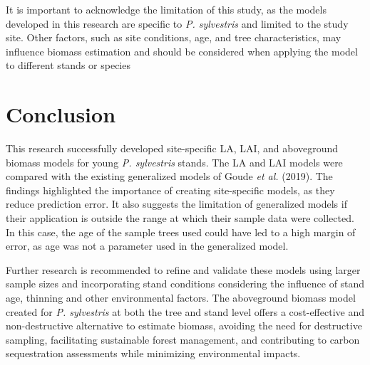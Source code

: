 \documentclass[11pt, a4paper]{report}
\begin{document}
It is important to acknowledge the limitation of this study, as the models developed in this research are specific to \textit{P. sylvestris} and limited to the study site. Other factors, such as site conditions, age, and tree characteristics, may influence biomass estimation and should be considered when applying the model to different stands or species

\chapter{Conclusion}
This research successfully developed site-specific LA, LAI, and aboveground biomass models for young \textit{P. sylvestris} stands. The LA and LAI models were compared with the existing generalized models of Goude \textit{et al.} (2019). The findings highlighted the importance of creating site-specific models, as they reduce prediction error. It also suggests the limitation of generalized models if their application is outside the range at which their sample data were collected. In this case, the age of the sample trees used could have led to a high margin of error, as age was not a parameter used in the generalized model.

Further research is recommended to refine and validate these models using larger sample sizes and incorporating stand conditions considering the influence of stand age, thinning and other environmental factors. The aboveground biomass model created for \textit{P. sylvestris} at both the tree and stand level offers a cost-effective and non-destructive alternative to estimate biomass, avoiding the need for destructive sampling, facilitating sustainable forest management, and contributing to carbon sequestration assessments while minimizing environmental impacts.
\end{document}
